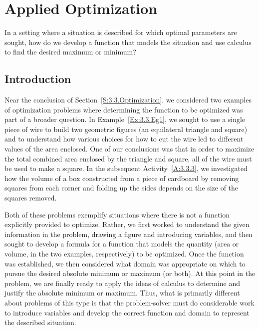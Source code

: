 \section{Applied Optimization} \label{S:3.4.AppliedOpt}

\begin{goals}
\item In a setting where a situation is described for which optimal parameters are sought, how do we develop a function that models the situation and use calculus to find the desired maximum or minimum?
\end{goals} 

\subsection*{Introduction}

Near the conclusion of Section~\ref{S:3.3.Optimization}, we considered two examples of optimization problems where determining the function to be optimized was part of a broader question.  In Example~\ref{Ex:3.3.Eg1}, we sought to use a single piece of wire to build two geometric figures (an equilateral triangle and square) and to understand how various choices for how to cut the wire led to different values of the area enclosed.  One of our conclusions was that in order to maximize the total combined area enclosed by the triangle and square, all of the wire must be used to make a square.  In the subsequent Activity~\ref{A:3.3.3}, we investigated how the volume of a box constructed from a piece of cardboard by removing squares from each corner and folding up the sides depends on the size of the squares removed.

Both of these problems exemplify situations where there is not a function explicitly provided to optimize.  Rather, we first worked to understand the given information in the problem, drawing a figure and introducing variables, and then sought to develop a formula for a function that models the quantity (area or volume, in the two examples, respectively) to be optimized.  Once the function was established, we then considered what domain was appropriate on which to pursue the desired absolute minimum or maximum (or both).  At this point in the problem, we are finally ready to apply the ideas of calculus to determine and justify the absolute minimum or maximum.  Thus, what is primarily different about problems of this type is that the problem-solver must do considerable work to introduce variables and develop the correct function and domain to represent the described situation. 

